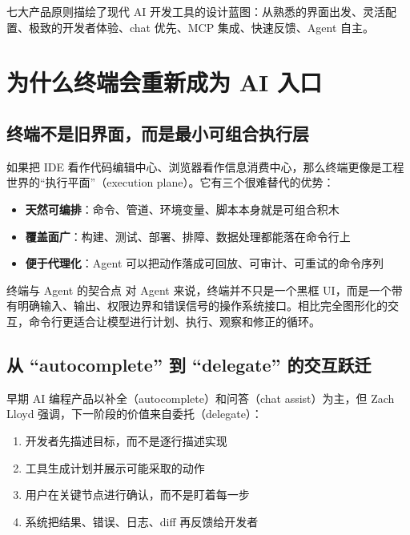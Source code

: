 \documentclass[a4paper]{article}
\begin{document}
七大产品原则描绘了现代 AI 开发工具的设计蓝图：从熟悉的界面出发、灵活配置、极致的开发者体验、chat 优先、MCP 集成、快速反馈、Agent 自主。

\section{为什么终端会重新成为 AI 入口}

\subsection{终端不是旧界面，而是最小可组合执行层}

如果把 IDE 看作代码编辑中心、浏览器看作信息消费中心，那么终端更像是工程世界的``执行平面''（execution plane）。它有三个很难替代的优势：

\begin{itemize}
    \item \textbf{天然可编排}：命令、管道、环境变量、脚本本身就是可组合积木
    \item \textbf{覆盖面广}：构建、测试、部署、排障、数据处理都能落在命令行上
    \item \textbf{便于代理化}：Agent 可以把动作落成可回放、可审计、可重试的命令序列
\end{itemize}

\begin{knowledgebox}{终端与 Agent 的契合点}
对 Agent 来说，终端并不只是一个黑框 UI，而是一个带有明确输入、输出、权限边界和错误信号的操作系统接口。相比完全图形化的交互，命令行更适合让模型进行计划、执行、观察和修正的循环。
\end{knowledgebox}

\subsection{从 ``autocomplete'' 到 ``delegate'' 的交互跃迁}

早期 AI 编程产品以补全（autocomplete）和问答（chat assist）为主，但 Zach Lloyd 强调，下一阶段的价值来自委托（delegate）：

\begin{enumerate}
    \item 开发者先描述目标，而不是逐行描述实现
    \item 工具生成计划并展示可能采取的动作
    \item 用户在关键节点进行确认，而不是盯着每一步
    \item 系统把结果、错误、日志、diff 再反馈给开发者
\end{enumerate}
\end{document}
